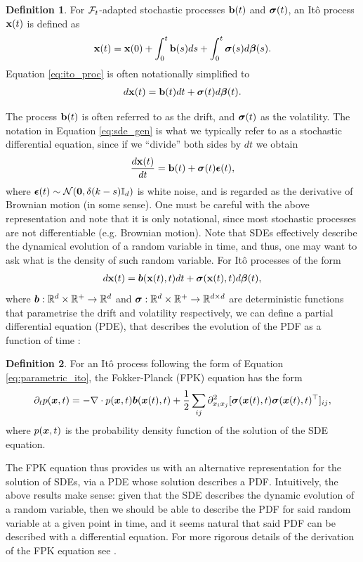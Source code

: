 \documentclass[a4paper,12pt,twoside,openright]{report}
\theoremstyle{definition}
\newtheorem{definition}{Definition}[section]
\begin{document}
\begin{definition}
    For ${\mathcal{F}}_t$-adapted stochastic processes ${\mathbf{b}}(t)$ and  ${\bm{\sigma}}(t)$, an Itô process ${\mathbf{x}}(t)$ is defined as
    \begin{align}\label{eq:ito_proc}
    {\mathbf{x}}(t) = {\mathbf{x}}(0) + \int_{0}^t {\mathbf{b}}(s) ds + \int_0^t {\bm{\sigma}}(s) d{\bm{\beta}}(s).
    \end{align}
Equation \ref{eq:ito_proc} is often notationally simplified to
    \begin{align}\label{eq:sde_gen}
        d{\mathbf{x}}(t) ={\mathbf{b}}(t) dt + {\bm{\sigma}}(t) d{\bm{\beta}}(t).
    \end{align}
\end{definition}
The process ${\mathbf{b}}(t)$ is often referred to as the drift, and ${\bm{\sigma}}(t)$ as the volatility. The notation in Equation \ref{eq:sde_gen} is what we typically refer to as a stochastic differential equation, since if we ``divide'' both sides by $dt$ we obtain
\begin{align*}
    \frac{d {\mathbf{x}}(t)}{dt} = {\mathbf{b}}(t) + {\bm{\sigma}}(t) {\bm{\epsilon}}(t),
\end{align*}
where ${\bm{\epsilon}}(t) \sim {\mathcal{N}}({\bm{0}}, \delta(k-s){\mathbb{I}_d})$ is white noise, and is regarded as the derivative of Brownian motion (in some sense). One must be careful with the above representation and note that it is only notational, since most stochastic processes are not differentiable (e.g. Brownian motion).
Note that SDEs effectively describe the dynamical evolution of a random variable in time, and thus, one may want to ask what is the density of such random variable. For Itô processes of the form
\begin{align}\label{eq:parametric_ito}
     d{\mathbf{x}}(t) ={\bm{b}}({\mathbf{x}}(t), t) dt + {\bm{\sigma}}({\mathbf{x}}(t), t) d{\bm{\beta}}(t),
\end{align}
where ${\bm{b}} : {\mathbb{R}}^d \times {\mathbb{R}}^{+} \rightarrow {\mathbb{R}}^d$ and ${\bm{\sigma}} : {\mathbb{R}}^d \times {\mathbb{R}}^{+} \rightarrow {\mathbb{R}}^{d\times d}$ are deterministic functions that parametrise the drift and volatility respectively, we can define a partial differential equation (PDE), that describes the evolution of the PDF as a function of time \citep{sarkka2019applied}:
\begin{definition}\label{def:fpk}
    For an Itô process following the form of Equation \ref{eq:parametric_ito}, the Fokker-Planck (FPK) equation has the form
    \begin{align}\label{eq:fpk}
        \partial_{t} p({\bm{x}}, t) =-\nabla \cdot p({\bm{x}}, t){\bm{b}}({\bm{x}}(t), t) + \frac{1}{2} \sum_{ij} \partial^2_{{x_i}{x_j}}[{\bm{\sigma}}({\bm{x}}(t), t){\bm{\sigma}}({\bm{x}}(t), t)^{\top}]_{ij},
    \end{align}
    where $p({\bm{x}}, t)$ is the probability density function of the solution of the SDE equation.
\end{definition}
The FPK equation thus provides us with an alternative representation for the solution of SDEs, via a PDE whose solution describes a PDF. Intuitively, the above results make sense: given that the SDE describes the dynamic evolution of a random variable, then we should be able to describe the PDF for said random variable at a given point in time, and it seems natural that said PDF can be described with a differential equation. For more rigorous details of the derivation of the FPK equation see \cite{sarkka2019applied}.
\end{document}

